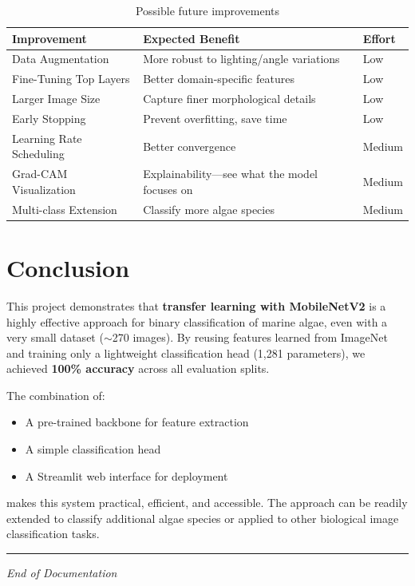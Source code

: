 \documentclass[12pt,a4paper]{article}
\begin{document}
\begin{table}[H]
    \centering
    \caption{Possible future improvements}
    \begin{tabular}{@{}p{4.5cm}p{6.5cm}l@{}}
        \toprule
        \textbf{Improvement} & \textbf{Expected Benefit} & \textbf{Effort} \\
        \midrule
        Data Augmentation        & More robust to lighting/angle variations & Low \\
        Fine-Tuning Top Layers   & Better domain-specific features          & Low \\
        Larger Image Size        & Capture finer morphological details      & Low \\
        Early Stopping           & Prevent overfitting, save time           & Low \\
        Learning Rate Scheduling & Better convergence                       & Medium \\
        Grad-CAM Visualization   & Explainability---see what the model focuses on & Medium \\
        Multi-class Extension    & Classify more algae species              & Medium \\
        \bottomrule
    \end{tabular}
\end{table}

\section{Conclusion}

This project demonstrates that \textbf{transfer learning with MobileNetV2} is a highly effective approach for binary classification of marine algae, even with a very small dataset ($\sim$270 images). By reusing features learned from ImageNet and training only a lightweight classification head (1,281 parameters), we achieved \textbf{100\% accuracy} across all evaluation splits.

The combination of:
\begin{itemize}
    \item A pre-trained backbone for feature extraction
    \item A simple classification head
    \item A Streamlit web interface for deployment
\end{itemize}

\noindent makes this system practical, efficient, and accessible. The approach can be readily extended to classify additional algae species or applied to other biological image classification tasks.

\vspace{1cm}
\noindent\rule{\textwidth}{0.4pt}
\begin{center}
    \textit{End of Documentation}
\end{center}
\end{document}
